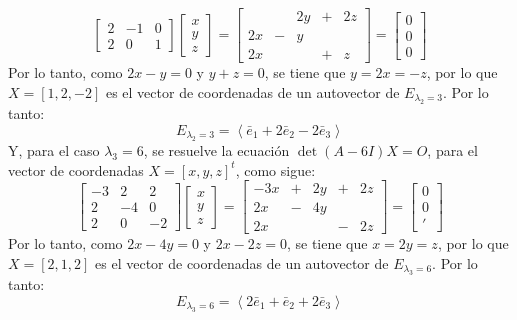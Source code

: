\begin{solucion}
\begin{enumerate}[$a$)]
\begin{equation*}
\begin{bmatrix}
    2 & -1 & 0 \\
    2 &  0 & 1
   \end{bmatrix}
   \begin{bmatrix}
    x \\ y \\ z
   \end{bmatrix}
   =
   \begin{bmatrix}
       &   & 2y & + & 2z \\
    2x & - &  y          \\
    2x &   &    & + & z
   \end{bmatrix}
   =
   \begin{bmatrix}
    0 \\ 0 \\ 0
   \end{bmatrix}
  \end{equation*}
  Por lo tanto, como $2x-y=0$ y $y+z = 0$, se tiene que $y = 2x = -z$, por lo que $X=[1, 2,-2]$ es el vector de coordenadas de un autovector de $E_{\lambda_2 = 3}$. Por lo tanto:
  \begin{equation*}
   E_{\lambda_2 = 3} = \left< \bar{e}_1 + 2\bar{e}_2 - 2\bar{e}_3 \right>
  \end{equation*}
  Y, para el caso $\lambda_3 = 6$, se resuelve la ecuaci\'on $\det(A - 6I)X = O$, para el vector de coordenadas $X = [x,y,z]^t$, como sigue:
  \begin{equation*}
   \begin{bmatrix}
    -3 &  2 &  2 \\
     2 & -4 &  0 \\
     2 &  0 & -2
   \end{bmatrix}
   \begin{bmatrix}
    x \\ y \\ z
   \end{bmatrix}
   = 
   \begin{bmatrix}
    -3x & + & 2y & + & 2z \\
     2x & - & 4y          \\
     2x &   &    & - & 2z
   \end{bmatrix}
   =
   \begin{bmatrix}
    0 \\ 0 \\ '
   \end{bmatrix}
  \end{equation*}
  Por lo tanto, como $2x - 4y = 0$ y $2x - 2z = 0$, se tiene que $x = 2y = z$, por lo que $X = [2, 1, 2]$ es el vector de coordenadas de un autovector de $E_{\lambda_3 = 6}$. Por lo tanto:
  \begin{equation*}
   E_{\lambda_3 = 6} = \left< 2\bar{e}_1 + \bar{e}_2 + 2\bar{e}_3 \right>
  \end{equation*}
  

\end{enumerate}
\end{solucion}
